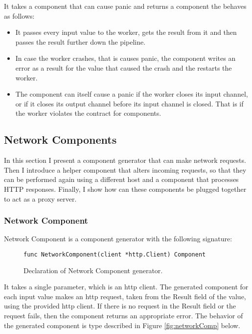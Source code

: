 \documentclass[12pt,a4paper]{article}
\begin{document}
It takes a component that can cause panic and returns a component the 
behaves as follows:
\begin{itemize}
	\item It passes every input value to the worker, gets the result 
          from it and then passes the result further down the pipeline.
	\item In case the worker crashes, that is causes panic, the component 
          writes an error as a result for the value that caused the crash 
          and the restarts the worker.
	\item The component can itself cause a panic if the worker closes its 
          input channel, or if it closes its output channel before its input 
          channel is closed. That is if the worker violates the contract
          for components.
\end{itemize}

\subsection{Network Components}
In this section I present a component generator that can make network
requests. Then I introduce a helper component that alters incoming 
requests, so that they can be performed again using a different host
and a component that processes HTTP responses. Finally, I show how
can these components be plugged together to act as a proxy server. 

\subsubsection{Network Component}
Network Component is a component generator with the following signature:
\begin{figure}[h]
\centering
\begin{lstlisting}
func NetworkComponent(client *http.Client) Component
\end{lstlisting}
\caption[scale=1.0]{Declaration of Network Component generator.}
\label{fig:NetworkComponent}
\end{figure}

It takes a single parameter, which is an http client.
The generated component for each input value makes an http request,
taken from the Result field of the value, using the provided http client.
If there is no request in the Result field or the request fails, then
the component returns an appropriate error. The behavior of the generated 
component is type described in Figure \ref{fig:networkComp}
below.
\end{document}
